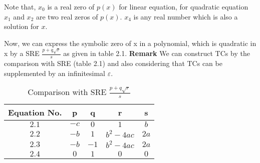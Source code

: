 Note that, $x_{0}$ is a real zero of $p(x)$ for linear equation, for quadratic equation $x_{1}$ and $x_{2}$ are two real zeros of $p(x)$. $x_{4}$ is any real number which is also a solution for $x$.


Now, we can express the symbolic zero of x in a polynomial, which is quadratic in x by a SRE $\frac{p+q\sqrt{r}}{s}$ as given in table 2.1.\newline
\textbf{Remark} We can construct TCs by the comparison with SRE (table 2.1) and also considering that TCs can be supplemented by an infinitesimal $\varepsilon$.

\begin{table}[htb]
	\caption{Comparison with SRE $\frac{p+q\sqrt{r}}{s}$}
	\label{tab:nameOfTheTable}
	\bigskip %
	\begin{center}
		\begin{tabular}{|c|c|c|c|c|}
			\hline
			Equation No.& p & q & r & s \\
			\hline
			$2.1$ & $-c$ & $0$ & $1$ & $b$ \\
			\hline
			$2.2$ & $-b$ & $1$ & $b^{2}-4ac$ & $2a$ \\
			\hline
			$2.3$ & $-b$ & $-1$ & $b^{2}-4ac$ & $2a$ \\
			\hline
			$2.4$ & $0$ & $1$ & $0$ & $0$ \\
			\hline
		\end{tabular}
	\end{center}
\end{table}


